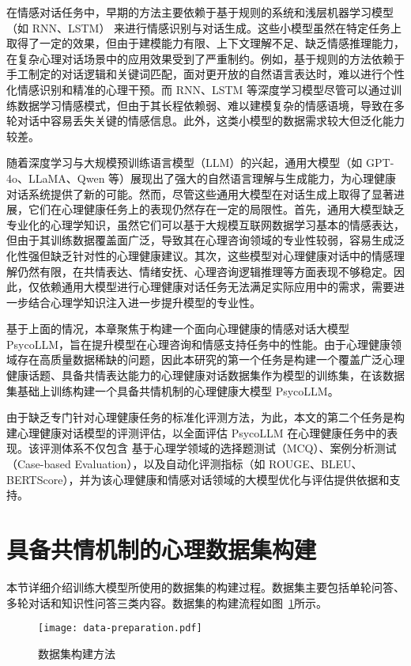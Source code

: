 在情感对话任务中，早期的方法主要依赖于基于规则的系统和浅层机器学习模型（如 RNN、LSTM） 来进行情感识别与对话生成。这些小模型虽然在特定任务上取得了一定的效果，但由于建模能力有限、上下文理解不足、缺乏情感推理能力，在复杂心理对话场景中的应用效果受到了严重制约。例如，基于规则的方法依赖于手工制定的对话逻辑和关键词匹配，面对更开放的自然语言表达时，难以进行个性化情感识别和精准的心理干预。而 RNN、LSTM 等深度学习模型尽管可以通过训练数据学习情感模式，但由于其长程依赖弱、难以建模复杂的情感语境，导致在多轮对话中容易丢失关键的情感信息。此外，这类小模型的数据需求较大但泛化能力较差。

随着深度学习与大规模预训练语言模型（LLM）的兴起，通用大模型（如 GPT-4o、LLaMA、Qwen 等）展现出了强大的自然语言理解与生成能力，为心理健康对话系统提供了新的可能。然而，尽管这些通用大模型在对话生成上取得了显著进展，它们在心理健康任务上的表现仍然存在一定的局限性。首先，通用大模型缺乏专业化的心理学知识，虽然它们可以基于大规模互联网数据学习基本的情感表达，但由于其训练数据覆盖面广泛，导致其在心理咨询领域的专业性较弱，容易生成泛化性强但缺乏针对性的心理健康建议。其次，这些模型对心理健康对话中的情感理解仍然有限，在共情表达、情绪安抚、心理咨询逻辑推理等方面表现不够稳定。因此，仅依赖通用大模型进行心理健康对话任务无法满足实际应用中的需求，需要进一步结合心理学知识注入进一步提升模型的专业性。

基于上面的情况，本章聚焦于构建一个面向心理健康的情感对话大模型 PsycoLLM，旨在提升模型在心理咨询和情感支持任务中的性能。由于心理健康领域存在高质量数据稀缺的问题，因此本研究的第一个任务是构建一个覆盖广泛心理健康话题、具备共情表达能力的心理健康对话数据集作为模型的训练集，在该数据集基础上训练构建一个具备共情机制的心理健康大模型 PsycoLLM。

由于缺乏专门针对心理健康任务的标准化评测方法，为此，本文的第二个任务是构建心理健康对话模型的评测评估，以全面评估 PsycoLLM 在心理健康任务中的表现。该评测体系不仅包含 基于心理学领域的选择题测试（MCQ）、案例分析测试（Case-based Evaluation），以及自动化评测指标（如 ROUGE、BLEU、BERTScore），并为该心理健康和情感对话领域的大模型优化与评估提供依据和支持。

\section{具备共情机制的心理数据集构建}

本节详细介绍训练大模型所使用的数据集的构建过程。数据集主要包括单轮问答、多轮对话和知识性问答三类内容。数据集的构建流程如图~\ref{data-preparation}所示。

\begin{figure}[ht]
  \centering
  \texttt{[image: data-preparation.pdf]}
  \caption{数据集构建方法}
  \label{data-preparation}
\end{figure}

